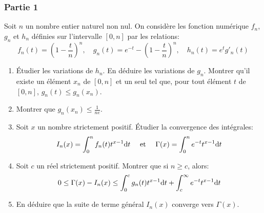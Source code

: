 \documentclass{article}
\def \de {{\rm d}}
\begin{document}
\subsubsection*{Partie 1}
Soit $n$ un nombre entier naturel non nul. On considère les fonction numérique $f_n$, $g_n$ et $h_n$ définies sur l'intervalle $[0,n]$ par les relations:
\[f_n(t)=(1-\frac tn)^n,\quad g_n(t)=e^{-t}-(1-\frac tn)^n,\quad h_n(t)=e^tg'_n(t)\] 
\begin{enumerate}
\item Étudier les variations de $h_n$. En déduire les variations de $g_n$. Montrer qu'il existe un élément $x_n$ de $[0,n]$ et un seul tel que, pour tout élément $t$ de $[0,n]$, $g_n(t)\leq g_n(x_n)$.
\item Montrer que $g_n(x_n)\leq \frac{1}{ne}$.
\item Soit $x$ un nombre strictement positif. Étudier la convergence des intégrales:
\[I_n(x)=\int_0^nf_n(t)t^{x-1}\de t\quad\mbox{ et }\quad \Gamma(x)=\int_0^ne^{-t}t^{x-1}\de t\]
\item Soit $c$ un réel strictement positif. Montrer que si $n\geq c$, alors:
\[0\leq \Gamma(x) - I_n(x)\leq \int_0^cg_n(t)t^{x-1}\de t +\int_c^\infty e^{-t}t^{x-1}\de t\]
\item En déduire que la suite de terme général $I_n(x)$ converge vers $\Gamma(x)$.
\end{enumerate}
\end{document}
